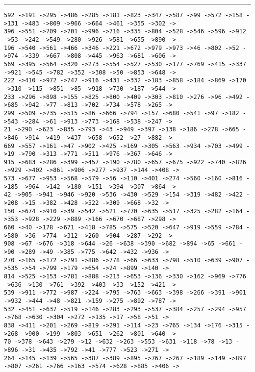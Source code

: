 \documentclass[letter, 12pt]{article}
\newenvironment{question}[1]{%
    \vspace{.2in}%
        \noindent{\bf #1}%
    \vspace{0.3em} \hrule \vspace{.1in}%
}{}
\begin{document}
\begin{question}{\large Appendix}
\begin{lstlisting}[style=CStyle]
592 ->191 ->295 ->486 ->285 ->181 ->823 ->347 ->587 ->99 ->572 ->158 ->131 ->483 ->809 ->966 ->664 ->461 ->355 ->302 ->
396 ->551 ->709 ->701 ->996 ->716 ->335 ->804 ->528 ->546 ->596 ->912 ->53 ->242 ->549 ->280 ->926 ->581 ->655 ->890 ->
196 ->540 ->561 ->466 ->346 ->221 ->672 ->979 ->973 ->46 ->802 ->52 ->974 ->339 ->667 ->808 ->445 ->963 ->681 ->606 ->
569 ->395 ->564 ->320 ->273 ->554 ->527 ->530 ->177 ->769 ->415 ->337 ->921 ->545 ->782 ->352 ->308 ->50 ->853 ->648 ->
222 ->410 ->972 ->747 ->916 ->431 ->332 ->183 ->858 ->184 ->869 ->170 ->310 ->115 ->851 ->85 ->918 ->730 ->187 ->544 ->
233 ->296 ->898 ->155 ->825 ->800 ->409 ->303 ->810 ->276 ->96 ->492 ->685 ->942 ->77 ->813 ->702 ->734 ->578 ->265 ->
299 ->509 ->735 ->515 ->86 ->666 ->794 ->157 ->680 ->541 ->97 ->182 ->543 ->284 ->61 ->913 ->773 ->168 ->538 ->247 ->
21 ->290 ->623 ->835 ->793 ->43 ->949 ->397 ->138 ->186 ->278 ->665 ->846 ->914 ->419 ->437 ->658 ->652 ->27 ->882 ->
669 ->557 ->161 ->47 ->902 ->425 ->169 ->305 ->563 ->934 ->703 ->499 ->19 ->790 ->313 ->771 ->511 ->976 ->367 ->646 ->
915 ->683 ->286 ->399 ->457 ->190 ->780 ->657 ->675 ->922 ->740 ->826 ->929 ->402 ->861 ->906 ->277 ->937 ->144 ->408 ->
573 ->677 ->953 ->568 ->579 ->56 ->110 ->401 ->274 ->560 ->160 ->816 ->185 ->964 ->142 ->180 ->151 ->394 ->307 ->864 ->
42 ->905 ->941 ->946 ->920 ->536 ->430 ->529 ->154 ->319 ->482 ->422 ->208 ->15 ->382 ->428 ->522 ->309 ->668 ->32 ->
150 ->674 ->910 ->39 ->542 ->521 ->770 ->635 ->517 ->325 ->282 ->164 ->353 ->928 ->229 ->889 ->166 ->670 ->687 ->298 ->
660 ->40 ->178 ->671 ->418 ->785 ->575 ->520 ->647 ->919 ->559 ->784 ->580 ->36 ->774 ->312 ->260 ->904 ->287 ->292 ->
908 ->67 ->676 ->318 ->644 ->26 ->638 ->390 ->682 ->894 ->65 ->661 ->90 ->289 ->49 ->385 ->775 ->642 ->432 ->936 ->
270 ->165 ->172 ->791 ->886 ->778 ->66 ->633 ->798 ->510 ->639 ->907 ->535 ->54 ->799 ->179 ->654 ->24 ->899 ->140 ->
814 ->525 ->153 ->781 ->888 ->213 ->653 ->136 ->330 ->162 ->969 ->776 ->636 ->130 ->761 ->392 ->403 ->33 ->152 ->421 ->
539 ->911 ->772 ->987 ->224 ->795 ->763 ->663 ->398 ->266 ->391 ->901 ->932 ->444 ->48 ->821 ->159 ->275 ->892 ->787 ->
532 ->451 ->637 ->519 ->146 ->283 ->293 ->537 ->384 ->257 ->294 ->957 ->768 ->630 ->304 ->272 ->135 ->17 ->58 ->51 ->
838 ->411 ->201 ->269 ->819 ->291 ->114 ->23 ->765 ->134 ->176 ->315 ->268 ->900 ->199 ->803 ->651 ->262 ->801 ->640 ->
70 ->378 ->643 ->279 ->12 ->632 ->263 ->553 ->631 ->118 ->78 ->13 ->896 ->31 ->435 ->792 ->41 ->777 ->523 ->271 ->
264 ->145 ->139 ->565 ->387 ->389 ->895 ->767 ->267 ->189 ->149 ->897 ->807 ->261 ->766 ->163 ->574 ->628 ->885 ->406 ->

\end{lstlisting}
\end{question}
\end{document}
